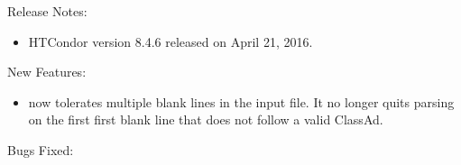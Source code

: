\noindent Release Notes:

\begin{itemize}

\item HTCondor version 8.4.6 released on April 21, 2016.

\end{itemize}


\noindent New Features:

\begin{itemize}

\item {}  now tolerates multiple blank lines in the
input file. It no longer quits parsing on the first first blank line that does not
follow a valid ClassAd.

\end{itemize}


\noindent Bugs Fixed:

